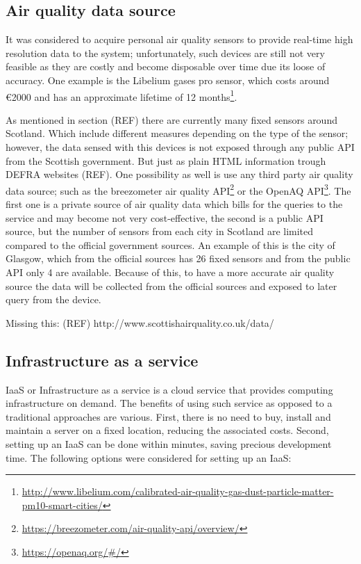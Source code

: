\subsection{Air quality data source}
It was considered to acquire personal air quality sensors to provide real-time high resolution data to the system; unfortunately, such devices are still not very feasible as they are costly and become disposable over time due its loose of accuracy. One example is the Libelium gases pro sensor, which costs around \euro{}2000 and has an approximate lifetime of 12 months\footnote{\url{http://www.libelium.com/calibrated-air-quality-gas-dust-particle-matter-pm10-smart-cities/}}. 

As mentioned in section (REF) there are currently many fixed sensors around Scotland. Which include different measures depending on the type of the sensor; however, the data sensed with this devices is not exposed through any public API from the Scottish government. But just as plain HTML information trough DEFRA websites (REF). One possibility as well is use any third party air quality data source; such as the breezometer air quality API\footnote{\url{https://breezometer.com/air-quality-api/overview/}} or the OpenAQ API\footnote{\url{https://openaq.org/#/}}. The first one is a private source of air quality data which bills for the queries to the service and may become not very cost-effective, the second is a public API source, but the number of sensors from each city in Scotland are limited compared to the official government sources. An example of this is the city of Glasgow, which from the official sources has 26 fixed sensors and from the public API only 4 are available. Because of this, to have a more accurate air quality source the data will be collected from the official sources and exposed to later query from the device. 

Missing this: (REF)
http://www.scottishairquality.co.uk/data/

\subsection{Infrastructure as a service}
IaaS or Infrastructure as a service is a cloud service that provides computing infrastructure on demand. The benefits of using such service as opposed to a traditional approaches are various. First, there is no need to buy, install and maintain a server on a fixed location, reducing the associated costs. Second, setting up an IaaS can be done within minutes, saving precious development time. The following options were considered for setting up an IaaS: 

